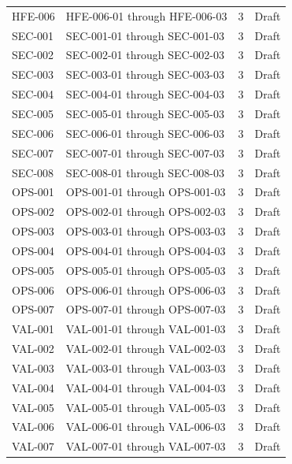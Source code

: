 \documentclass[11pt,letterpaper]{article}
\begin{document}
\begin{small}
\begin{longtable}{@{}L{0.14\textwidth}L{0.56\textwidth}L{0.12\textwidth}L{0.10\textwidth}@{}}
\addlinespace[2pt]
HFE-006 & HFE-006-01 through HFE-006-03 & 3 & Draft \\
\addlinespace[2pt]
SEC-001 & SEC-001-01 through SEC-001-03 & 3 & Draft \\
\addlinespace[2pt]
SEC-002 & SEC-002-01 through SEC-002-03 & 3 & Draft \\
\addlinespace[2pt]
SEC-003 & SEC-003-01 through SEC-003-03 & 3 & Draft \\
\addlinespace[2pt]
SEC-004 & SEC-004-01 through SEC-004-03 & 3 & Draft \\
\addlinespace[2pt]
SEC-005 & SEC-005-01 through SEC-005-03 & 3 & Draft \\
\addlinespace[2pt]
SEC-006 & SEC-006-01 through SEC-006-03 & 3 & Draft \\
\addlinespace[2pt]
SEC-007 & SEC-007-01 through SEC-007-03 & 3 & Draft \\
\addlinespace[2pt]
SEC-008 & SEC-008-01 through SEC-008-03 & 3 & Draft \\
\addlinespace[2pt]
OPS-001 & OPS-001-01 through OPS-001-03 & 3 & Draft \\
\addlinespace[2pt]
OPS-002 & OPS-002-01 through OPS-002-03 & 3 & Draft \\
\addlinespace[2pt]
OPS-003 & OPS-003-01 through OPS-003-03 & 3 & Draft \\
\addlinespace[2pt]
OPS-004 & OPS-004-01 through OPS-004-03 & 3 & Draft \\
\addlinespace[2pt]
OPS-005 & OPS-005-01 through OPS-005-03 & 3 & Draft \\
\addlinespace[2pt]
OPS-006 & OPS-006-01 through OPS-006-03 & 3 & Draft \\
\addlinespace[2pt]
OPS-007 & OPS-007-01 through OPS-007-03 & 3 & Draft \\
\addlinespace[2pt]
VAL-001 & VAL-001-01 through VAL-001-03 & 3 & Draft \\
\addlinespace[2pt]
VAL-002 & VAL-002-01 through VAL-002-03 & 3 & Draft \\
\addlinespace[2pt]
VAL-003 & VAL-003-01 through VAL-003-03 & 3 & Draft \\
\addlinespace[2pt]
VAL-004 & VAL-004-01 through VAL-004-03 & 3 & Draft \\
\addlinespace[2pt]
VAL-005 & VAL-005-01 through VAL-005-03 & 3 & Draft \\
\addlinespace[2pt]
VAL-006 & VAL-006-01 through VAL-006-03 & 3 & Draft \\
\addlinespace[2pt]
VAL-007 & VAL-007-01 through VAL-007-03 & 3 & Draft \\

\end{longtable}
\end{small}
\end{document}
